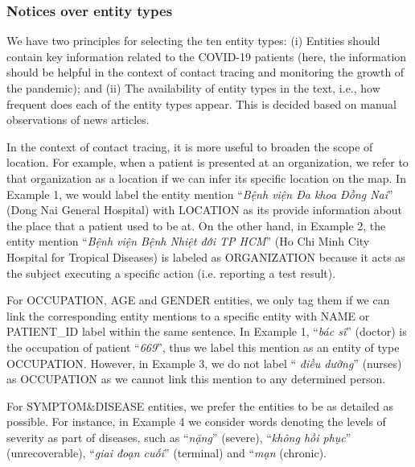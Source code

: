 \documentclass[11pt]{article}
\begin{document}
\subsubsection*{Notices over entity types}

We have two principles for selecting the ten entity types: (i) Entities should contain key information related to the COVID-19 patients (here, the information should be helpful in the context of contact tracing and monitoring the growth of the pandemic); and (ii) The availability of entity types in the text, i.e., how frequent does each of the entity types appear. This is decided based on manual observations of news articles.


In the context of contact tracing, it is more useful to broaden the scope of location.
For example, when a patient is presented at an organization, we refer to that organization as a location if we can infer its specific location on the map.
In Example 1, we would label the entity mention ``\textit{Bệnh viện Đa khoa Đồng Nai}'' (Dong Nai General Hospital) with LOCATION as its provide information about the place that a patient used to be at. On the other hand, in Example 2, the entity mention ``\textit{Bệnh viện Bệnh Nhiệt đới TP HCM}'' (Ho Chi Minh City Hospital for Tropical Diseases)  is labeled as ORGANIZATION because it acts as the subject executing a specific action (i.e. reporting a  test result). 

For OCCUPATION, AGE and GENDER entities, we only tag them if we can link the corresponding entity mentions to a specific entity with NAME or PATIENT\_ID label within the same sentence.
In Example 1, ``\textit{bác sĩ}'' (doctor)  is the occupation of patient ``\textit{669}'', thus we label this mention as an entity of type OCCUPATION.
However, in Example 3, we do not label `` \textit{điều dưỡng}'' (nurses) as OCCUPATION as we cannot link this mention to any determined person.

For SYMPTOM\&DISEASE entities, we prefer the entities to be as detailed as possible. For instance, in Example 4 we consider words denoting the levels of severity as part of diseases, such as ``\textit{nặng}'' (severe), ``\textit{không hồi phục}'' (unrecoverable), ``\textit{giai đoạn cuối}'' (terminal) and ``\textit{mạn} (chronic).
\end{document}
